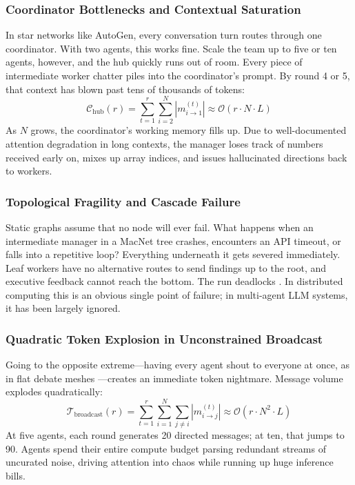\documentclass{ieeeaccess}
\begin{document}
\subsubsection{Coordinator Bottlenecks and Contextual Saturation}
In star networks like AutoGen, every conversation turn routes through one coordinator. With two agents, this works fine. Scale the team up to five or ten agents, however, and the hub quickly runs out of room. Every piece of intermediate worker chatter piles into the coordinator's prompt. By round 4 or 5, that context has blown past tens of thousands of tokens:
\begin{equation}
\label{eq:coordinator_context_growth}
\mathcal{C}_{\text{hub}}(r) = \sum_{t=1}^r \sum_{i=2}^N |m_{i \to 1}^{(t)}| \approx \mathcal{O}(r \cdot N \cdot L)
\end{equation}
As $N$ grows, the coordinator's working memory fills up. Due to well-documented attention degradation in long contexts, the manager loses track of numbers received early on, mixes up array indices, and issues hallucinated directions back to workers.

\subsubsection{Topological Fragility and Cascade Failure}
Static graphs assume that no node will ever fail. What happens when an intermediate manager in a MacNet tree crashes, encounters an API timeout, or falls into a repetitive loop? Everything underneath it gets severed immediately. Leaf workers have no alternative routes to send findings up to the root, and executive feedback cannot reach the bottom. The run deadlocks \cite{ruan2025mast, chen2025resilience}. In distributed computing this is an obvious single point of failure; in multi-agent LLM systems, it has been largely ignored.

\subsubsection{Quadratic Token Explosion in Unconstrained Broadcast}
Going to the opposite extreme---having every agent shout to everyone at once, as in flat debate meshes \cite{qian2024chatdev, du2023debate}---creates an immediate token nightmare. Message volume explodes quadratically:
\begin{equation}
\label{eq:broadcast_token_growth}
\mathcal{T}_{\text{broadcast}}(r) = \sum_{t=1}^r \sum_{i=1}^N \sum_{j \neq i} |m_{i \to j}^{(t)}| \approx \mathcal{O}(r \cdot N^2 \cdot L)
\end{equation}
At five agents, each round generates 20 directed messages; at ten, that jumps to 90. Agents spend their entire compute budget parsing redundant streams of uncurated noise, driving attention into chaos while running up huge inference bills.
\end{document}
